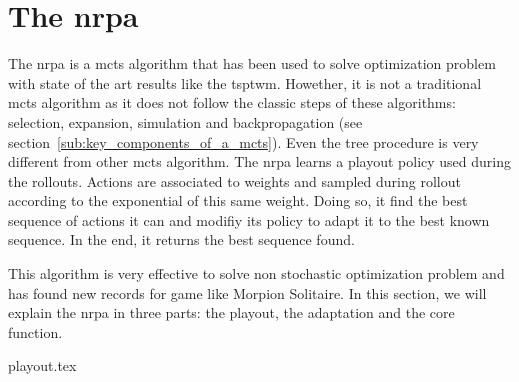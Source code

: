 \section{The \acrlong{nrpa}}%
\label{sec:the_nrpa}

The \gls{nrpa}\cite{nrpa} is a \gls{mcts} algorithm that has been used to solve optimization problem with state of the art results like the \gls{tsptwm}\cite{nrpa_tsptw}.
Howether, it is not a traditional \gls{mcts} algorithm as it does not follow the classic steps of these algorithms: selection, expansion, simulation and backpropagation (see section~\ref{sub:key_components_of_a_mcts}).
Even the tree procedure is very different from other \gls{mcts} algorithm.
The \gls{nrpa} learns a playout policy used during the rollouts.
Actions are associated to weights and sampled during rollout according to the exponential of this same weight.
Doing so, it find the best sequence of actions it can and modifiy its policy to adapt it to the best known sequence.
In the end, it returns the best sequence found.

This algorithm is very effective to solve non stochastic optimization problem and has found new records for game like Morpion Solitaire.
In this section, we will explain the \gls{nrpa} in three parts: the playout, the adaptation and the core function.

{playout.tex}

